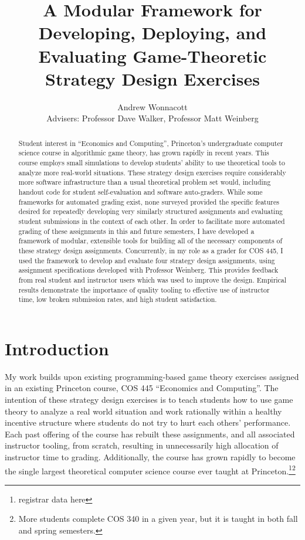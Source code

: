 \documentclass[pageno]{jpaper}
\begin{document}
\title{
A Modular Framework for Developing, Deploying, and Evaluating Game-Theoretic Strategy Design Exercises}

\author{Andrew Wonnacott\\
  Advisers: Professor Dave Walker, Professor Matt Weinberg}

\date{}
\maketitle

\thispagestyle{empty}
\doublespacing{}
\begin{abstract}
  Student interest in ``Economics and Computing'', Princeton's undergraduate computer science course in algorithmic game theory, has grown rapidly in recent years.
  This course employs small simulations to develop students' ability to use theoretical tools to analyze more real-world situations.
  These strategy design exercises require considerably more software infrastructure than a usual theoretical problem set would, including handout code for student self-evaluation and software auto-graders.
  While some frameworks for automated grading exist, none surveyed provided the specific features desired for repeatedly developing very similarly structured assignments and evaluating student submissions in the context of each other.
  In order to facilitate more automated grading of these assignments in this and future semesters, I have developed a framework of modular, extensible tools for building all of the necessary components of these strategy design assignments.
  Concurrently, in my role as a grader for COS 445, I used the framework to develop and evaluate four strategy design assignments, using assignment specifications developed with Professor Weinberg.
  This provides feedback from real student and instructor users which was used to improve the design.
  Empirical results demonstrate the importance of quality tooling to effective use of instructor time, low broken submission rates, and high student satisfaction.
\end{abstract}

\newpage
\section*{Introduction}
My work builds upon existing programming-based game theory exercises assigned in an existing Princeton course, COS 445 ``Economics and Computing''.
The intention of these strategy design exercises is to teach students how to use game theory to analyze a real world situation and work rationally within a healthy incentive structure where students do not try to hurt each others’ performance.
Each past offering of the course has rebuilt these assignments, and all associated instructor tooling, from scratch, resulting in unnecessarily high allocation of instructor time to grading.
Additionally, the course has grown rapidly to become the single largest theoretical computer science course ever taught at Princeton.\footnote{registrar data here}\footnote{More students complete COS 340 in a given year, but it is taught in both fall and spring semesters.}
\end{document}
